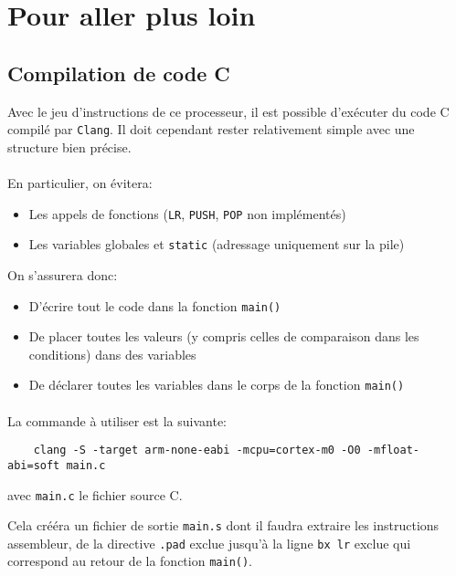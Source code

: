 \documentclass{article}
\begin{document}
    \section{Pour aller plus loin}

    \subsection{Compilation de code C}
    Avec le jeu d'instructions de ce processeur, il est possible d'exécuter du code C compilé par \texttt{Clang}.
    Il doit cependant rester relativement simple avec une structure bien précise.

    \paragraph{}
    En particulier, on évitera:
    \begin{itemize}
        \item Les appels de fonctions (\texttt{LR}, \texttt{PUSH}, \texttt{POP} non implémentés)
        \item Les variables globales et \texttt{static} (adressage uniquement sur la pile)
    \end{itemize}

    On s'assurera donc:
    \begin{itemize}
        \item D'écrire tout le code dans la fonction \texttt{main()}
        \item De placer toutes les valeurs (y compris celles de comparaison dans les conditions) dans des variables
        \item De déclarer toutes les variables dans le corps de la fonction \texttt{main()}
    \end{itemize}

    \paragraph{}
    La commande à utiliser est la suivante:
    \begin{lstlisting}
	clang -S -target arm-none-eabi -mcpu=cortex-m0 -O0 -mfloat-abi=soft main.c
    \end{lstlisting}
    avec \texttt{main.c} le fichier source C.

    Cela crééra un fichier de sortie \texttt{main.s} dont il faudra extraire les instructions assembleur,
    de la directive \texttt{.pad} exclue jusqu'à la ligne \texttt{bx lr} exclue qui correspond au retour de la fonction \texttt{main()}.
\end{document}
